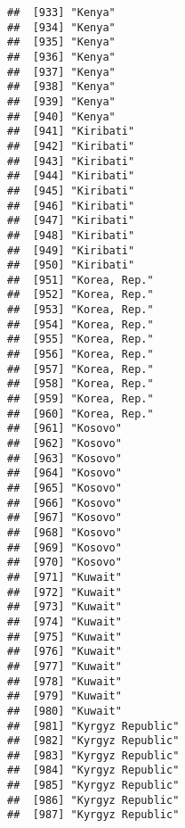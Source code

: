 \documentclass[]{article}
\begin{document}
\begin{verbatim}
##  [933] "Kenya"                              
##  [934] "Kenya"                              
##  [935] "Kenya"                              
##  [936] "Kenya"                              
##  [937] "Kenya"                              
##  [938] "Kenya"                              
##  [939] "Kenya"                              
##  [940] "Kenya"                              
##  [941] "Kiribati"                           
##  [942] "Kiribati"                           
##  [943] "Kiribati"                           
##  [944] "Kiribati"                           
##  [945] "Kiribati"                           
##  [946] "Kiribati"                           
##  [947] "Kiribati"                           
##  [948] "Kiribati"                           
##  [949] "Kiribati"                           
##  [950] "Kiribati"                           
##  [951] "Korea, Rep."                        
##  [952] "Korea, Rep."                        
##  [953] "Korea, Rep."                        
##  [954] "Korea, Rep."                        
##  [955] "Korea, Rep."                        
##  [956] "Korea, Rep."                        
##  [957] "Korea, Rep."                        
##  [958] "Korea, Rep."                        
##  [959] "Korea, Rep."                        
##  [960] "Korea, Rep."                        
##  [961] "Kosovo"                             
##  [962] "Kosovo"                             
##  [963] "Kosovo"                             
##  [964] "Kosovo"                             
##  [965] "Kosovo"                             
##  [966] "Kosovo"                             
##  [967] "Kosovo"                             
##  [968] "Kosovo"                             
##  [969] "Kosovo"                             
##  [970] "Kosovo"                             
##  [971] "Kuwait"                             
##  [972] "Kuwait"                             
##  [973] "Kuwait"                             
##  [974] "Kuwait"                             
##  [975] "Kuwait"                             
##  [976] "Kuwait"                             
##  [977] "Kuwait"                             
##  [978] "Kuwait"                             
##  [979] "Kuwait"                             
##  [980] "Kuwait"                             
##  [981] "Kyrgyz Republic"                    
##  [982] "Kyrgyz Republic"                    
##  [983] "Kyrgyz Republic"                    
##  [984] "Kyrgyz Republic"                    
##  [985] "Kyrgyz Republic"                    
##  [986] "Kyrgyz Republic"                    
##  [987] "Kyrgyz Republic"                    

\end{verbatim}
\end{document}
